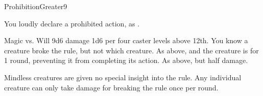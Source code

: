 \begin{spellsection}{Prohibition}{Greater}{9}
\begin{spellheader}
\end{spellheader}
\begin{spellcontent}
    \spelleffect You loudly declare a prohibited action, as .
    \spelldur \durshort
\end{spellcontent}
\begin{spellsubcontent}
    \begin{spelltargetinginfo}
    \end{spelltargetinginfo}
    \begin{spelleffects}
        \begin{spellattack}{Magic vs. Will}
            \spellsuccess 9d6 damage \add 1d6 per four caster levels above 12th. You know a creature broke the rule, but not which creature.
            \spellcritical As above, and the creature is \stunned for 1 round, preventing it from completing its action.
            \spellfailure As above, but half damage.
        \end{spellattack}
    \end{spelleffects}
\end{spellsubcontent}
\begin{spellfooter}
    \spellnotes Mindless creatures are given no special insight into the rule. Any individual creature can only take damage for breaking the rule once per round.
\end{spellfooter}
\end{spellsection}

